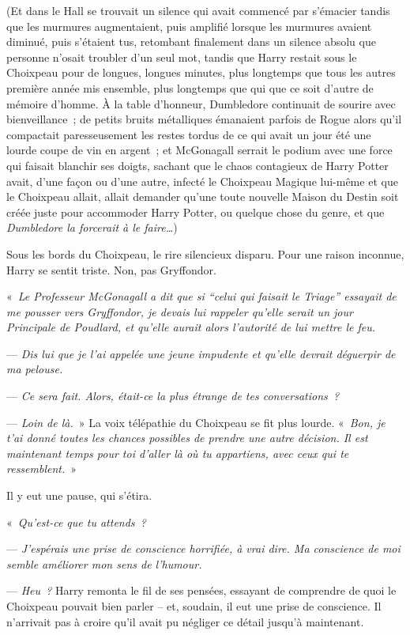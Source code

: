 (Et dans le Hall se trouvait un silence qui avait commencé par s'émacier tandis que les murmures augmentaient, puis amplifié lorsque les murmures avaient diminué, puis s'étaient tus, retombant finalement dans un silence absolu que personne n'osait troubler d'un seul mot, tandis que Harry restait sous le Choixpeau pour de longues, longues minutes, plus longtemps que tous les autres première année mis ensemble, plus longtemps que qui que ce soit d'autre de mémoire d'homme. À la table d'honneur, Dumbledore continuait de sourire avec bienveillance~; de petits bruits métalliques émanaient parfois de Rogue alors qu'il compactait paresseusement les restes tordus de ce qui avait un jour été une lourde coupe de vin en argent~; et McGonagall serrait le podium avec une force qui faisait blanchir ses doigts, sachant que le chaos contagieux de Harry Potter avait, d'une façon ou d'une autre, infecté le Choixpeau Magique lui-même et que le Choixpeau allait, allait demander qu'une toute nouvelle Maison du Destin soit créée juste pour accommoder Harry Potter, ou quelque chose du genre, et que \emph{Dumbledore la forcerait à le faire…})

Sous les bords du Choixpeau, le rire silencieux disparu. Pour une raison inconnue, Harry se sentit triste. Non, pas Gryffondor.

«~\emph{Le Professeur McGonagall a dit que si “celui qui faisait le Triage” essayait de me pousser vers Gryffondor, je devais lui rappeler qu'elle serait un jour Principale de Poudlard, et qu'elle aurait alors l'autorité de lui mettre le feu.}

--- \emph{Dis lui que je l'ai appelée une jeune impudente et qu'elle devrait déguerpir de ma pelouse.}

--- \emph{Ce sera fait. Alors, était-ce la plus étrange de tes conversations~?}

--- \emph{Loin de là.}~» La voix télépathie du Choixpeau se fit plus lourde. «~\emph{Bon, je t'ai donné toutes les chances possibles de prendre une autre décision. Il est maintenant temps pour toi d'aller là où tu appartiens, avec ceux qui te ressemblent.}~»

Il y eut une pause, qui s'étira.

«~\emph{Qu'est-ce que tu attends~?}

--- \emph{J'espérais une prise de conscience horrifiée, à vrai dire. Ma conscience de moi semble améliorer mon sens de l'humour.}

--- \emph{Heu~?} Harry remonta le fil de ses pensées, essayant de comprendre de quoi le Choixpeau pouvait bien parler -- et, soudain, il eut une prise de conscience. Il n'arrivait pas à croire qu'il avait pu négliger ce détail jusqu'à maintenant.

